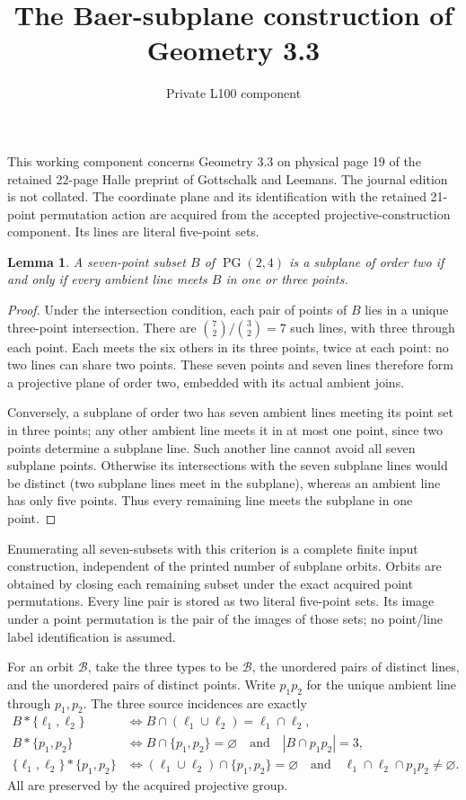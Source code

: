 \documentclass[11pt]{article}
\title{The Baer-subplane construction of Geometry 3.3}
\author{Private L100 component}\date{}
\newtheorem{lemma}{Lemma}\newtheorem{theorem}{Theorem}
\begin{document}
\maketitle
This working component concerns Geometry 3.3 on physical page 19 of the
retained 22-page Halle preprint of Gottschalk and Leemans. The journal
edition is not collated. The coordinate plane and its identification with
the retained 21-point permutation action are acquired from the accepted
projective-construction component. Its lines are literal five-point sets.

\begin{lemma}
A seven-point subset $B$ of $\operatorname{PG}(2,4)$ is a subplane of order
two if and only if every ambient line meets $B$ in one or three points.
\end{lemma}
\begin{proof}
Under the intersection condition, each pair of points of $B$ lies in a
unique three-point intersection. There are $\binom72/\binom32=7$ such
lines, with three through each point. Each meets the six others in its
three points, twice at each point: no two lines can share two points.
These seven points and seven lines therefore form a projective plane of
order two, embedded with its actual ambient joins.

Conversely, a subplane of order two has seven ambient lines meeting its
point set in three points; any other ambient line meets it in at most
one point, since two points determine a subplane line. Such another line
cannot avoid all seven subplane points. Otherwise its intersections with
the seven subplane lines would be distinct (two subplane lines meet in
the subplane), whereas an ambient line has only five points. Thus every
remaining line meets the subplane in one point.
\end{proof}

Enumerating all seven-subsets with this criterion is a complete finite
input construction, independent of the printed number of subplane orbits.
Orbits are obtained by closing each remaining subset under the exact
acquired point permutations. Every line pair is stored as two literal
five-point sets. Its image under a point permutation is the pair of the
images of those sets; no point/line label identification is assumed.

For an orbit $\mathcal B$, take the three types to be $\mathcal B$,
the unordered pairs of distinct lines, and the unordered pairs of distinct
points. Write $p_1p_2$ for the unique ambient line through $p_1,p_2$.
The three source incidences are exactly
\begin{align*}
B*\{\ell_1,\ell_2\}&\iff B\cap(\ell_1\cup\ell_2)=\ell_1\cap\ell_2,\\
B*\{p_1,p_2\}&\iff B\cap\{p_1,p_2\}=\varnothing\quad\text{and}\quad|B\cap p_1p_2|=3,\\
\{\ell_1,\ell_2\}*\{p_1,p_2\}&\iff
(\ell_1\cup\ell_2)\cap\{p_1,p_2\}=\varnothing\quad\text{and}\quad
\ell_1\cap\ell_2\cap p_1p_2\ne\varnothing.
\end{align*}
All are preserved by the acquired projective group.
\end{document}
